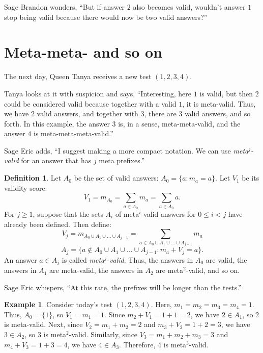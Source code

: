 \documentclass[12pt,reqno]{article}
\theoremstyle{plain}
\theoremstyle{definition}
\newtheorem{definition}{Definition}
\newtheorem{example}{Example}
\theoremstyle{remark}
\begin{document}
Sage Brandon wonders, ``But if answer $2$ also becomes valid, wouldn't answer $1$ stop being valid because there would now be two valid answers?''

\section{Meta-meta- and so on}

The next day, Queen Tanya receives a new test $(1, 2, 3, 4)$.

Tanya looks at it with suspicion and says, ``Interesting, here $1$ is valid, but then $2$ could be considered valid because together with a valid $1$, it is meta-valid. Thus, we have $2$ valid answers, and together with $3$, there are $3$ valid answers, and so forth. In this example, the answer $3$ is, in a sense, meta-meta-valid, and the answer $4$ is meta-meta-meta-valid.''

Sage Eric adds, ``I suggest making a more compact notation. We can use \textit{meta$^j$-valid} for an answer that has $j$ meta prefixes.''

\begin{definition}
Let $A_{0}$ be the set of valid answers: $A_{0} = \{a : m_{a} = a\}$.
Let $V_1$ be its validity score:
\[V_{1} = m_{A_0} = \sum_{a \in A_{0}} m_{a} = \sum_{a \in A_{0}} a.\]
For $j \ge 1$, suppose that the sets $A_i$ of meta$^i$-valid answers for $0 \le i < j$ have already been defined. Then define:
\[V_{j} = m_{A_{0} \cup A_{1} \cup \dots \cup A_{j-1}} = \sum_{a \in A_{0} \cup A_{1} \cup \dots \cup A_{j-1}} m_{a}\]
\[A_{j} = \{a \notin A_{0} \cup A_{1} \cup \dots \cup A_{j-1} : m_{a} + V_{j} = a\}.\]
An answer $a \in A_{j}$ is called \textit{meta$^j$-valid}. Thus, the answers in $A_{0}$ are valid, the answers in $A_{1}$ are meta-valid, the answers in $A_{2}$ are meta$^2$-valid, and so on.
\end{definition}

Sage Eric whispers, ``At this rate, the prefixes will be longer than the tests.''

\begin{example}
Consider today's test $(1, 2, 3, 4)$. Here, $m_{1} = m_{2} = m_{3} = m_{4} = 1$. Thus, $A_{0} = \{1\}$, so $V_{1} = m_{1} = 1$. Since $m_{2} + V_{1} = 1 + 1 = 2$, we have $2 \in A_{1}$, so $2$ is meta-valid. Next, since $V_{2} = m_{1} + m_{2} = 2$ and $m_{3} + V_{2} = 1 + 2 = 3$, we have $3 \in A_{2}$, so $3$ is meta$^2$-valid. Similarly, since $V_{3} = m_{1} + m_{2} + m_{3} = 3$ and $m_{4} + V_{3} = 1 + 3 = 4$, we have $4 \in A_{3}$. Therefore, $4$ is meta$^3$-valid. 
\end{example}
\end{document}
